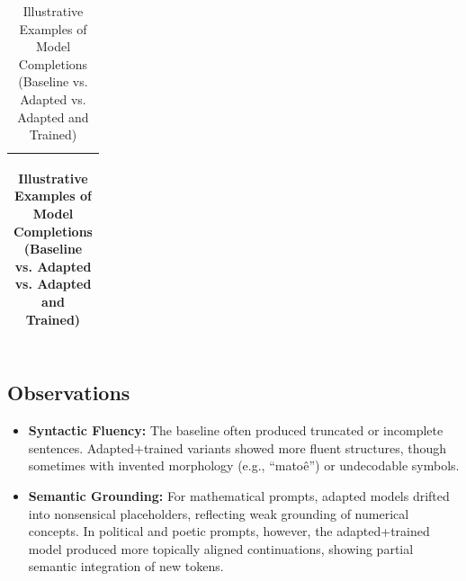 \begin{table}[h]
\begin{tabular}{p{\linewidth}}
\begin{tabularx}{\linewidth}{p{0.33\linewidth}|p{0.33\linewidth}|p{0.33\linewidth}}
\end{tabularx} \\
\bottomrule
\end{tabular}
\caption{Illustrative Examples of Model Completions (Baseline vs. Adapted vs. Adapted and Trained)}
\label{tab:example_completions_horizontal}
\end{table}




\subsection*{Observations}
\begin{itemize}
    \item \textbf{Syntactic Fluency:} The baseline often produced truncated or incomplete sentences. Adapted+trained variants showed more fluent structures, though sometimes with invented morphology (e.g., ``matoê'') or undecodable symbols.
    \item \textbf{Semantic Grounding:} For mathematical prompts, adapted models drifted into nonsensical placeholders, reflecting weak grounding of numerical concepts. In political and poetic prompts, however, the adapted+trained model produced more topically aligned continuations, showing partial semantic integration of new tokens.
\end{itemize}





